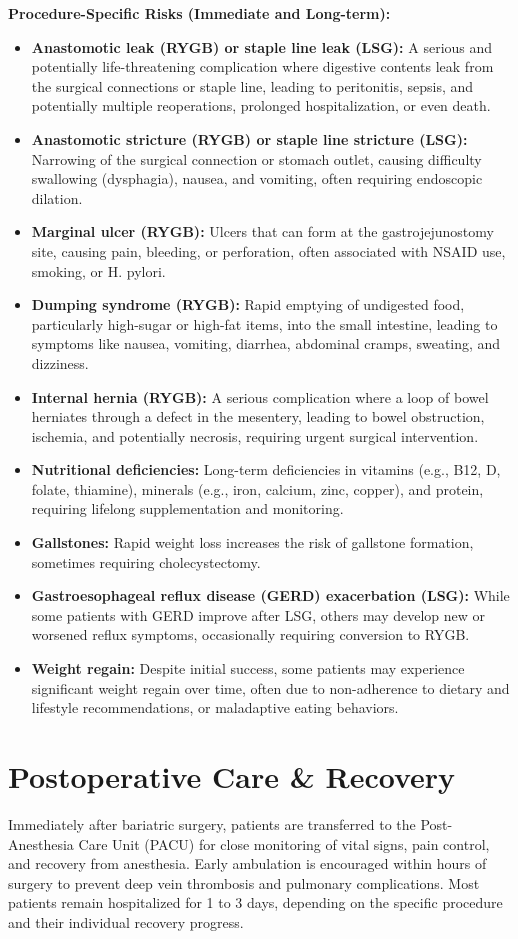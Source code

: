 \textbf{Procedure-Specific Risks (Immediate and Long-term):}
\begin{itemize}
  \item \textbf{Anastomotic leak (RYGB) or staple line leak (LSG):} A serious and potentially life-threatening complication where digestive contents leak from the surgical connections or staple line, leading to peritonitis, sepsis, and potentially multiple reoperations, prolonged hospitalization, or even death.
  \item \textbf{Anastomotic stricture (RYGB) or staple line stricture (LSG):} Narrowing of the surgical connection or stomach outlet, causing difficulty swallowing (dysphagia), nausea, and vomiting, often requiring endoscopic dilation.
  \item \textbf{Marginal ulcer (RYGB):} Ulcers that can form at the gastrojejunostomy site, causing pain, bleeding, or perforation, often associated with NSAID use, smoking, or H. pylori.
  \item \textbf{Dumping syndrome (RYGB):} Rapid emptying of undigested food, particularly high-sugar or high-fat items, into the small intestine, leading to symptoms like nausea, vomiting, diarrhea, abdominal cramps, sweating, and dizziness.
  \item \textbf{Internal hernia (RYGB):} A serious complication where a loop of bowel herniates through a defect in the mesentery, leading to bowel obstruction, ischemia, and potentially necrosis, requiring urgent surgical intervention.
  \item \textbf{Nutritional deficiencies:} Long-term deficiencies in vitamins (e.g., B12, D, folate, thiamine), minerals (e.g., iron, calcium, zinc, copper), and protein, requiring lifelong supplementation and monitoring.
  \item \textbf{Gallstones:} Rapid weight loss increases the risk of gallstone formation, sometimes requiring cholecystectomy.
  \item \textbf{Gastroesophageal reflux disease (GERD) exacerbation (LSG):} While some patients with GERD improve after LSG, others may develop new or worsened reflux symptoms, occasionally requiring conversion to RYGB.
  \item \textbf{Weight regain:} Despite initial success, some patients may experience significant weight regain over time, often due to non-adherence to dietary and lifestyle recommendations, or maladaptive eating behaviors.
\end{itemize}

\section*{Postoperative Care \& Recovery}
Immediately after bariatric surgery, patients are transferred to the Post-Anesthesia Care Unit (PACU) for close monitoring of vital signs, pain control, and recovery from anesthesia. Early ambulation is encouraged within hours of surgery to prevent deep vein thrombosis and pulmonary complications. Most patients remain hospitalized for 1 to 3 days, depending on the specific procedure and their individual recovery progress. 

